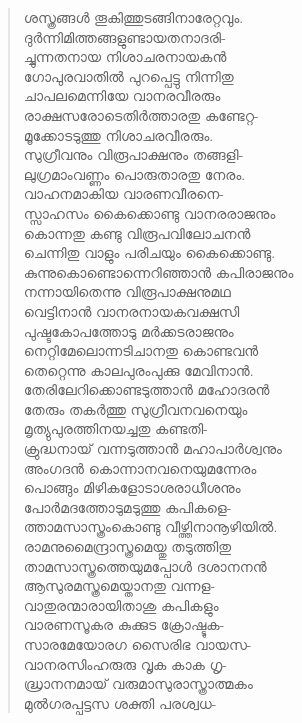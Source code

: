 \begin{verse}
ശസ്ത്രങ്ങള്‍ തൂകിത്തുടങ്ങിനാരേറ്റവും.\\
ദുര്‍ന്നിമിത്തങ്ങളുണ്ടായതനാദരി-\\
ച്ചുന്നതനായ നിശാചരനായകന്‍\\
ഗോപുരവാതില്‍ പുറപ്പെട്ടു നിന്നിതു\\
ചാപലമെന്നിയേ വാനരവീരരും\\
രാക്ഷസരോടെതിര്‍ത്താരതു കണ്ടേറ്റ-\\
മൂക്കോടടുത്തു നിശാചരവീരരും.\\
സുഗ്രീവനും വിരൂപാക്ഷനും തങ്ങളി-\\
ലുഗ്രമാംവണ്ണം പൊരുതാരതു നേരം.\\
വാഹനമാകിയ വാരണവീരനെ-\\
സ്സാഹസം കൈക്കൊണ്ടു വാനരരാജനും\\
കൊന്നതു കണ്ടു വിരൂപവിലോചനന്‍\\
ചെന്നിതു വാളും പരിചയും കൈക്കൊണ്ടു.\\
കുന്നുകൊണ്ടൊന്നെറിഞ്ഞാന്‍ കപിരാജനും\\
നന്നായിതെന്നു വിരൂപാക്ഷനുമഥ\\
വെട്ടിനാന്‍ വാനരനായകവക്ഷസി\\
പുഷ്ടകോപത്തോടു മര്‍ക്കടരാജനും\\
നെറ്റിമേലൊന്നടിചാനതു കൊണ്ടവന്‍\\
തെറ്റെന്നു കാലപുരംപുക്കു മേവിനാന്‍.\\
തേരിലേറിക്കൊണ്ടടുത്താന്‍ മഹോദരന്‍\\
തേരും തകര്‍ത്തു സുഗ്രീവനവനെയും\\
മൃത്യുപുരത്തിനയച്ചതു കണ്ടതി-\\
ക്രുദ്ധനായ് വന്നടുത്താന്‍ മഹാപാര്‍ശ്വനും\\
അംഗദന്‍ കൊന്നാനവനെയുമന്നേരം\\
പൊങ്ങും മിഴികളോടാശരാധീശനും\\
പോര്‍മദത്തോടുമടുത്തു കപികളെ-\\
ത്താമസാസ്ത്രംകൊണ്ടു വീഴ്ത്തിനാനൂഴിയില്‍.\\
രാമനുമൈന്ദ്രാസ്ത്രമെയ്തു തടുത്തിതു\\
താമസാസ്ത്രത്തെയുമപ്പോള്‍ ദശാനനന്‍\\
ആസുരമസ്ത്രമെയ്താനതു വന്നള-\\
വാതുരന്മാരായിതാശു കപികളും\\
വാരണസൂകര കുക്കുട ക്രോഷ്ടുക-\\
സാരമേയോരഗ സൈരിഭ വായസ-\\
വാനരസിംഹരുരു വൃക കാക ഗൃ-\\
ദ്ധ്രാനനമായ് വരുമാസുരാസ്ത്രാത്മകം\\
മുല്‍ഗരപ്പട്ടസ ശക്തി പരശ്വധ-\\

\end{verse}
